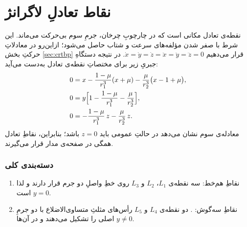 \section{نقاط تعادلِ لاگرانژ}\label{sec:lag-points}

نقطه‌ی تعادل مکانی است که در چارچوبِ چرخان، جرمِ سوم بی‌حرکت می‌ماند. این شرط با صفر شدن مؤلفه‌های سرعت و شتاب حاصل می‌شود؛ ازاین‌رو در معادلاتِ حرکتِ بخش \ref{sec:crtbp} قرار می‌دهیم $\dot x=\dot y=\dot z=\ddot x=\ddot y=\ddot z=0$. در نتیجه دستگاهِ جبریِ زیر برای مختصاتِ نقطه‌ی تعادل به‌دست می‌آید:
\begin{align}
	0 &= x-\frac{1-\mu}{r_{1}^{3}}(x+\mu)-\frac{\mu}{r_{2}^{3}}\bigl(x-1+\mu\bigr),\\
	0 &= y\Bigl[1-\frac{1-\mu}{r_{1}^{3}}-\frac{\mu}{r_{2}^{3}}\Bigr],\\
	0 &= -\frac{1-\mu}{r_{1}^{3}}\,z-\frac{\mu}{r_{2}^{3}}\,z.
\end{align}
معادله‌ی سوم نشان می‌دهد در حالتِ عمومی باید $z=0$ باشد؛ بنابراین، نقاطِ تعادل همگی در صفحه‌ی مدار قرار می‌گیرند.

\subsubsection{دسته‌بندی کلی}
\begin{enumerate}
	\item {
		نقاطِ هم‌خط:
	} سه نقطه‌ی $L_{1}$، $L_{2}$ و $L_{3}$ روی خطِ واصلِ دو جرم قرار دارند و لذا $y=0$ است.
	\item {
		نقاطِ سه‌گوش:
		.} دو نقطه‌ی $L_{4}$ و $L_{5}$ رأس‌های مثلثِ متساوی‌الاضلاع با دو جرمِ اصلی را تشکیل می‌دهند و در آن‌ها $y\ne0$.
\end{enumerate}


